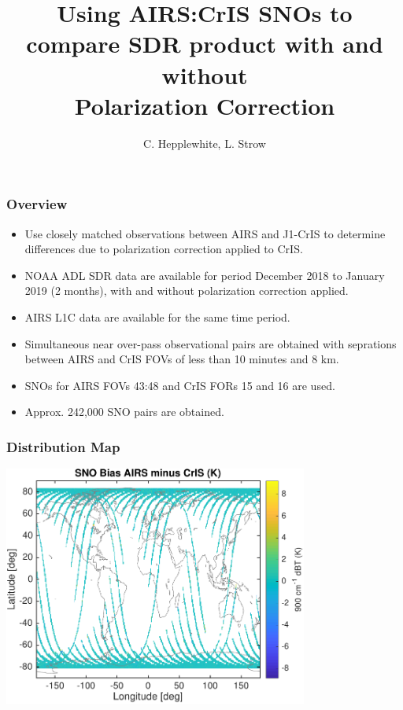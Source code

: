 \documentclass[10pt,t]{beamer} \usepackage[utf8]{inputenc}
\title[]{Using AIRS:CrIS SNOs to compare SDR product with and without \\
Polarization Correction}
\author{C. Hepplewhite, L. Strow}
\newcommand{\cris}{\textsf{CrIS}\xspace}
\newcommand{\airs}{\textsf{AIRS}\xspace}
\begin{document}
\begin{frame}
  \titlepage
\end{frame}
\begin{frame}
  \frametitle{Overview}

  \begin{itemize}
  \item Use closely matched observations between \airs and J1-\cris to
    determine differences due to polarization correction applied to \cris.
  \item NOAA ADL SDR data are available for period December 2018 to January
    2019 (2 months), with and without polarization correction applied.
  \item \airs L1C data are available for the same time period.
  \item Simultaneous near over-pass observational pairs are obtained with
    seprations between \airs and \cris FOVs of less than 10 minutes and 8 km.
  \item SNOs for \airs FOVs 43:48 and \cris FORs 15 and 16 are used.
  \item Approx. 242,000 SNO pairs are obtained.
  \end{itemize}

\end{frame}
\begin{frame}
  \frametitle{Distribution Map}
  \begin{center}
    \noindent\includegraphics[width=0.75\textwidth]{Figs/sno_airs_cris2_bias_map.pdf}
  \end{center}
\end{frame}
\end{document}
